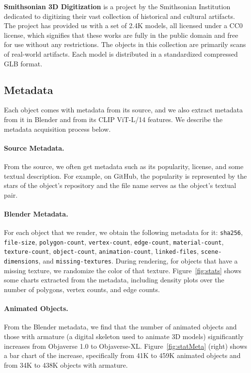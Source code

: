 \textbf{Smithsonian 3D Digitization} is a project by the Smithsonian Institution dedicated to digitizing their vast collection of historical and cultural artifacts. The project has provided us with a set of 2.4K models, all licensed under a CC0 license, which signifies that these works are fully in the public domain and free for use without any restrictions. The objects in this collection are primarily scans of real-world artifacts. Each model is distributed in a standardized compressed GLB format.

\subsection{Metadata}
\label{sec:metadata}

Each object comes with metadata from its source, and we also extract metadata from it in Blender and from its CLIP ViT-L/14 features. We describe the metadata acquisition process below.

\paragraph{Source Metadata.} From the source, we often get metadata such as its popularity, license, and some textual description. For example, on GitHub, the popularity is represented by the stars of the object's repository and the file name serves as the object's textual pair.

\paragraph{Blender Metadata.} For each object that we render, we obtain the following metadata for it: \texttt{sha256}, \texttt{file-size}, \texttt{polygon-count}, \texttt{vertex-count}, \texttt{edge-count}, \texttt{material-count}, \texttt{texture-count}, \texttt{object-count}, \texttt{animation-count},
\texttt{linked-files},
\texttt{scene-dimensions}, and
\texttt{missing-textures}.
During rendering, for objects that have a missing texture, we randomize the color of that texture. Figure~\ref{fig:stats} shows some charts extracted from the metadata, including density plots over the number of polygons, vertex counts, and edge counts.%

\paragraph{Animated Objects.}
From the Blender metadata, we find that the number of animated objects and those with armature (a digital skeleton used to animate 3D models) significantly increases from Objaverse 1.0 to Objaverse-XL. Figure~\ref{fig:statMeta} (right) shows a bar chart of the increase, specifically from 41K to 459K animated objects and from 34K to 438K objects with armature.

